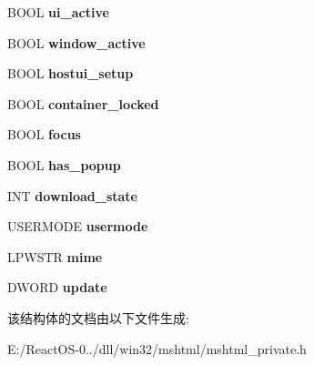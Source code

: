 \begin{DoxyCompactItemize}
\item 
\mbox{\label{struct_h_t_m_l_document_obj_aa2c796a93575a5a9e141f897dfdef4c2}} 
B\+O\+OL {\bfseries ui\+\_\+active}
\item 
\mbox{\label{struct_h_t_m_l_document_obj_aae9d0d64d145dde964496feb8d69498d}} 
B\+O\+OL {\bfseries window\+\_\+active}
\item 
\mbox{\label{struct_h_t_m_l_document_obj_af7982f35daefca0d824f45ae727a4f14}} 
B\+O\+OL {\bfseries hostui\+\_\+setup}
\item 
\mbox{\label{struct_h_t_m_l_document_obj_a6b105b04563d60a4cb2167d9930bfff0}} 
B\+O\+OL {\bfseries container\+\_\+locked}
\item 
\mbox{\label{struct_h_t_m_l_document_obj_ac936df1f2452e5a69d3dfa83107972e3}} 
B\+O\+OL {\bfseries focus}
\item 
\mbox{\label{struct_h_t_m_l_document_obj_a5073eb7d253b0e2c7a44e0813abf703d}} 
B\+O\+OL {\bfseries has\+\_\+popup}
\item 
\mbox{\label{struct_h_t_m_l_document_obj_a32d4884d855c418966b0d46553f3ab4d}} 
I\+NT {\bfseries download\+\_\+state}
\item 
\mbox{\label{struct_h_t_m_l_document_obj_a30525fdf062137bb087644eb6bec82fd}} 
U\+S\+E\+R\+M\+O\+DE {\bfseries usermode}
\item 
\mbox{\label{struct_h_t_m_l_document_obj_af2a65a139ae95f589c13e8f806f4c112}} 
L\+P\+W\+S\+TR {\bfseries mime}
\item 
\mbox{\label{struct_h_t_m_l_document_obj_aed1abd659b02d0bf20c97dc35abcfe1e}} 
D\+W\+O\+RD {\bfseries update}
\end{DoxyCompactItemize}


该结构体的文档由以下文件生成\+:\begin{DoxyCompactItemize}
\item 
E\+:/\+React\+O\+S-\/0../dll/win32/mshtml/mshtml\+\_\+private.\+h\end{DoxyCompactItemize}
